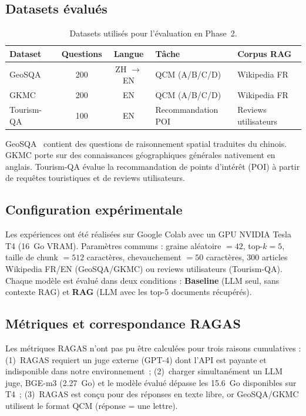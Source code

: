 \documentclass[12pt,a4paper]{article}
\begin{document}
\subsection{Datasets \'evalu\'es}

\begin{table}[H]
\centering
\caption{Datasets utilis\'es pour l'\'evaluation en Phase~2.}
\label{tab:datasets}
\begin{tabular}{@{} l c c l l @{}}
\toprule
\textbf{Dataset} & \textbf{Questions} & \textbf{Langue} & \textbf{T\^ache} & \textbf{Corpus RAG} \\
\midrule
GeoSQA~\cite{huang_geosqa_2019}
  & 200 & ZH $\to$ EN & QCM (A/B/C/D) & Wikipedia FR \\
\rowcolor{lightgray}
GKMC & 200 & EN & QCM (A/B/C/D) & Wikipedia FR \\
Tourism-QA~\cite{tourismqa2021}
  & 100 & EN & Recommandation POI & Reviews utilisateurs \\
\bottomrule
\end{tabular}
\end{table}

GeoSQA~\cite{huang_geosqa_2019} contient des questions de raisonnement spatial traduites du
chinois. GKMC porte sur des connaissances g\'eographiques g\'en\'erales nativement en anglais.
Tourism-QA \'evalue la recommandation de points d'int\'er\^et (POI) \`a partir de requ\^etes
touristiques et de reviews utilisateurs.

\subsection{Configuration exp\'erimentale}

Les exp\'eriences ont \'et\'e r\'ealis\'ees sur Google Colab avec un GPU NVIDIA Tesla T4
(16~Go VRAM). Param\`etres communs : graine al\'eatoire $= 42$, top-$k = 5$, taille de
chunk $= 512$ caract\`eres, chevauchement $= 50$ caract\`eres, 300 articles Wikipedia FR/EN
(GeoSQA/GKMC) ou reviews utilisateurs (Tourism-QA). Chaque mod\`ele est \'evalu\'e dans deux
conditions : \textbf{Baseline} (LLM seul, sans contexte RAG) et \textbf{RAG} (LLM avec les
top-5 documents r\'ecup\'er\'es).

\subsection{M\'etriques et correspondance RAGAS}

Les m\'etriques RAGAS n'ont pas pu \^etre calcul\'ees pour trois raisons cumulatives :
(1)~RAGAS requiert un juge externe (GPT-4) dont l'API est payante et indisponible dans notre
environnement~; (2)~charger simultan\'ement un LLM juge, BGE-m3 (2.27~Go) et le mod\`ele
\'evalu\'e d\'epasse les 15.6~Go disponibles sur T4~; (3)~RAGAS est con\c{c}u pour des
r\'eponses en texte libre, or GeoSQA/GKMC utilisent le format QCM (r\'eponse = une lettre).
\end{document}
